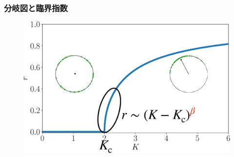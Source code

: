 \begin{frame}\frametitle{分岐図と臨界指数}
  \begin{figure}
    \centering
    \includegraphics[scale=0.3]{figs/bif_exp-crop.pdf}

\end{figure}
\end{frame}
